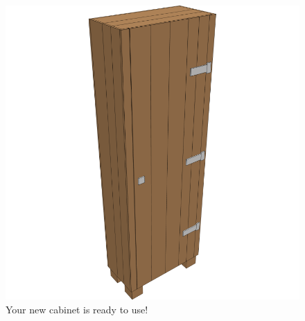 \documentclass{article}
\begin{document}
\begin{figure}[h!]
    \centering
    \includegraphics[width=\textwidth]{scene 12 - compleet.png}
    \caption{Your new cabinet is ready to use!}
\end{figure}
\end{document}
